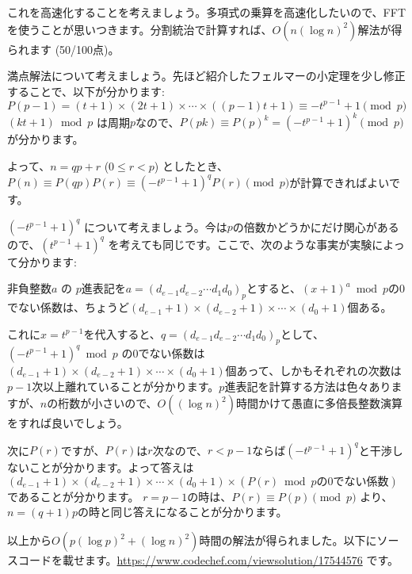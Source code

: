 \documentclass{jsarticle}
\begin{document}
  これを高速化することを考えましょう。多項式の乗算を高速化したいので、FFTを使うことが思いつきます。分割統治で計算すれば、$O(n (\log n)^2)$解法が得られます (50/100点)。

  満点解法について考えましょう。先ほど紹介したフェルマーの小定理を少し修正することで、以下が分かります:
  \begin{displaymath}
   P(p - 1) = (t + 1) \times (2t + 1) \times \cdots \times ((p - 1)t + 1)
   \equiv -t^{p-1} + 1 \pmod p
  \end{displaymath}
  $(kt + 1) \bmod p$ は周期$p$なので、$P(pk) \equiv P(p)^k = (-t^{p-1}+1)^k \pmod p$
  が分かります。

  よって、$n = qp + r$ ($0 \le r < p$) としたとき、$P(n) \equiv P(qp)P(r) \equiv (-t^{p-1}+1)^qP(r) \pmod p$が計算できればよいです。

  $(-t^{p-1}+1)^q$ について考えましょう。今は$p$の倍数かどうかにだけ関心があるので、$(t^{p-1}+1)^q$ を考えても同じです。ここで、次のような事実が実験によって分かります:
  \begin{center}
   非負整数$a$ の $p$進表記を$a = (d_{e-1}d_{e-2}\cdots d_1d_0)_p$とすると、$(x+1)^a \bmod p$の0でない係数は、ちょうど$(d_{e-1} + 1) \times (d_{e-2} + 1) \times \cdots \times (d_0 + 1)$個ある。
  \end{center}
  これに$x = t^{p-1}$を代入すると、$q = (d_{e-1}d_{e-2}\cdots d_1d_0)_p$として、
  $(-t^{p-1}+1)^q \bmod p$ の0でない係数は$(d_{e-1} + 1) \times (d_{e-2} + 1) \times \cdots \times (d_0 + 1)$個あって、しかもそれぞれの次数は$p-1$次以上離れていることが分かります。$p$進表記を計算する方法は色々ありますが、$n$の桁数が小さいので、$O((\log n)^2)$時間かけて愚直に多倍長整数演算をすれば良いでしょう。

  次に$P(r)$ですが、$P(r)$は$r$次なので、$r < p - 1$ならば$(-t^{p-1}+1)^q$と干渉しないことが分かります。よって答えは$(d_{e-1} + 1) \times (d_{e-2} + 1) \times \cdots \times (d_0 + 1) \times (P(r)\bmod p\mbox{の0でない係数})$であることが分かります。
  $r = p - 1$の時は、$P(r) \equiv P(p) \pmod p$ より、$n = (q + 1)p$の時と同じ答えになることが分かります。

  以上から$O(p(\log p)^2 + (\log n)^2)$時間の解法が得られました。以下にソースコードを載せます。\url{https://www.codechef.com/viewsolution/17544576} です。
  
\end{document}
